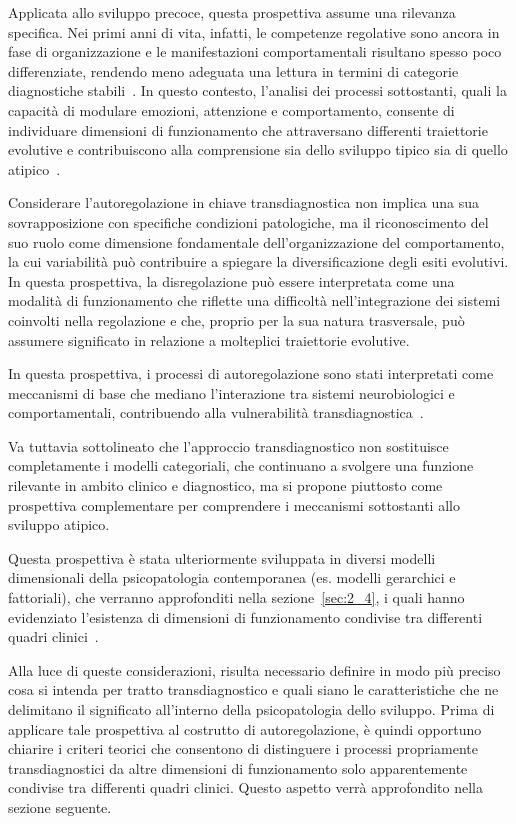         Applicata allo sviluppo precoce, questa prospettiva assume una rilevanza specifica. Nei primi anni di vita, infatti, le competenze regolative sono ancora in fase di organizzazione e le manifestazioni comportamentali risultano spesso poco differenziate, rendendo meno adeguata una lettura in termini di categorie diagnostiche stabili~\cite{calkins2007}. In questo contesto, l'analisi dei processi sottostanti, quali la capacità di modulare emozioni, attenzione e comportamento, consente di individuare dimensioni di funzionamento che attraversano differenti traiettorie evolutive e contribuiscono alla comprensione sia dello sviluppo tipico sia di quello atipico~\cite{blair2015}.

        Considerare l'autoregolazione in chiave transdiagnostica non implica una sua sovrapposizione con specifiche condizioni patologiche, ma il riconoscimento del suo ruolo come dimensione fondamentale dell'organizzazione del comportamento, la cui variabilità può contribuire a spiegare la diversificazione degli esiti evolutivi. In questa prospettiva, la disregolazione può essere interpretata come una modalità di funzionamento che riflette una difficoltà nell'integrazione dei sistemi coinvolti nella regolazione e che, proprio per la sua natura trasversale, può assumere significato in relazione a molteplici traiettorie evolutive.

        In questa prospettiva, i processi di autoregolazione sono stati interpretati come meccanismi di base che mediano l'interazione tra sistemi neurobiologici e comportamentali, contribuendo alla vulnerabilità transdiagnostica~\cite{beauchaine2019}.

        Va tuttavia sottolineato che l'approccio transdiagnostico non sostituisce completamente i modelli categoriali, che continuano a svolgere una funzione rilevante in ambito clinico e diagnostico, ma si propone piuttosto come prospettiva complementare per comprendere i meccanismi sottostanti allo sviluppo atipico.

        Questa prospettiva è stata ulteriormente sviluppata in diversi modelli dimensionali della psicopatologia contemporanea (es. modelli gerarchici e fattoriali), che verranno approfonditi nella sezione~\ref{sec:2_4}, i quali hanno evidenziato l'esistenza di dimensioni di funzionamento condivise tra differenti quadri clinici~\cite{caspi2014,kotov2017}.

        Alla luce di queste considerazioni, risulta necessario definire in modo più preciso cosa si intenda per tratto transdiagnostico e quali siano le caratteristiche che ne delimitano il significato all'interno della psicopatologia dello sviluppo. Prima di applicare tale prospettiva al costrutto di autoregolazione, è quindi opportuno chiarire i criteri teorici che consentono di distinguere i processi propriamente transdiagnostici da altre dimensioni di funzionamento solo apparentemente condivise tra differenti quadri clinici. Questo aspetto verrà approfondito nella sezione seguente.

